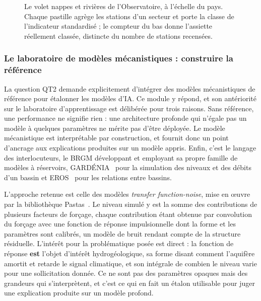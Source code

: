 \begin{figure}[H]
\centering
{}
\caption{Le volet nappes et rivières de l'Observatoire, à l'échelle du pays. Chaque pastille agrège les stations d'un secteur et porte la classe de l'indicateur standardisé ; le compteur du bas donne l'assiette réellement classée, distincte du nombre de stations recensées. \lecas}
\label{fig:st32-observatoire}
\end{figure}


\subsubsection{Le laboratoire de modèles mécanistiques : construire la référence}
\label{sec:labo-metier}

La question QT2 demande explicitement d'intégrer des modèles mécanistiques de référence pour étalonner les modèles d'IA. Ce module y répond, et son antériorité sur le laboratoire d'apprentissage est délibérée pour trois raisons. Sans référence, une performance ne signifie rien : une architecture profonde qui n'égale pas un modèle à quelques paramètres ne mérite pas d'être déployée. Le modèle mécanistique est interprétable par construction, et fournit donc un point d'ancrage aux explications produites sur un modèle appris. Enfin, c'est le langage des interlocuteurs, le BRGM développant et employant sa propre famille de modèles à réservoirs, GARDÉNIA~\cite{gardenia} pour la simulation des niveaux et des débits d'un bassin et EROS~\cite{eros} pour les relations entre bassins.

L'approche retenue est celle des modèles \emph{transfer function-noise}, mise en œuvre par la bibliothèque Pastas~\cite{pastas}. Le niveau simulé y est la somme des contributions de plusieurs facteurs de forçage, chaque contribution étant obtenue par convolution du forçage avec une fonction de réponse impulsionnelle dont la forme et les paramètres sont calibrés, un modèle de bruit rendant compte de la structure résiduelle. L'intérêt pour la problématique posée est direct : la fonction de réponse \textbf{est} l'objet d'intérêt hydrogéologique, sa forme disant comment l'aquifère amortit et retarde le signal climatique, et son intégrale de combien le niveau varie pour une sollicitation donnée. Ce ne sont pas des paramètres opaques mais des grandeurs qui s'interprètent, et c'est ce qui en fait un étalon utilisable pour juger une explication produite sur un modèle profond.

